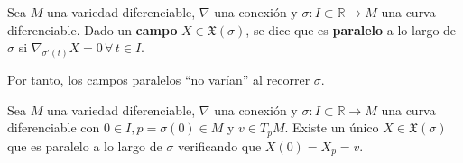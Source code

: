 \begin{defi}
    Sea $M$ una variedad diferenciable, $\nabla$ una conexión y $\sigma: I \subset \mathbb R \to M$ una curva diferenciable. Dado un \textbf{campo} $X \in \mathfrak X(\sigma)$, se dice que es \textbf{paralelo} a lo largo de $\sigma$ si $\nabla_{\sigma'(t)} X = 0 \, \forall\, t \in I$.
\end{defi}

\begin{obs}
    Por tanto, los campos paralelos ``no varían'' al recorrer $\sigma$.
\end{obs}

\begin{teo}
    Sea $M$ una variedad diferenciable, $\nabla$ una conexión y $\sigma: I \subset \mathbb R \to M$ una curva diferenciable con $0 \in I, p = \sigma(0) \in M$ y $v\in T_pM$. Existe un único $X \in \mathfrak X(\sigma)$ que es paralelo a lo largo de $\sigma$ verificando que $X(0) = X_p = v$.
\end{teo}
